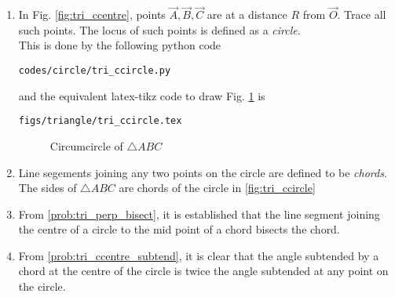 \renewcommand{\theequation}{\theenumi}
\begin{enumerate}[label=\arabic*.,ref=\thesubsection.\theenumi]

\item In Fig. \ref{fig:tri_ccentre}, points $\vec{A}, \vec{B}, \vec{C}$  are at a distance $R$ from $\vec{O}$.  Trace all such points. The locus of such points is defined as a {\em circle}.
%
\\
\solution This is done by the following python code
%
\begin{lstlisting}
codes/circle/tri_ccircle.py
\end{lstlisting}
%
and the equivalent latex-tikz code to draw Fig. \ref{fig:tri_ccircle} is
%
\begin{lstlisting}
figs/triangle/tri_ccircle.tex
\end{lstlisting}

\begin{figure}[!ht]
	\begin{center}
		
		\resizebox{\columnwidth}{!}{}
	\end{center}
	\caption{Circumcircle of $\triangle ABC$}
	\label{fig:tri_ccircle}	
\end{figure}
%
\item Line segements joining any two points on the circle are defined to be {\em chords}. The sides of $\triangle ABC$ are chords of the circle in 	\eqref{fig:tri_ccircle}	

\item From  \eqref{prob:tri_perp_bisect}, it is established that the line segment joining the centre of a circle to the mid point of a chord bisects the chord.
\item From \eqref{prob:tri_ccentre_subtend}, it is clear that the angle subtended by a chord at the centre of the circle is twice the angle subtended at any point on the circle.
\label{them:tri_ccentre_subtend}
%

\end{enumerate}

